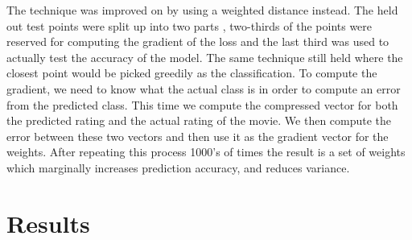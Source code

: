 \documentclass[review,onefignum,onetabnum]{siamart171218}
\begin{document}
The technique was improved on by using a weighted distance instead. The held out test points were split up into two parts , two-thirds of the points were reserved for computing the gradient of the loss and the last third was used to actually test the accuracy of the model. The same technique still held where the closest point would be picked greedily as the classification. To compute the gradient, we need to know what the actual class is in order to compute an error from the predicted class. This time we compute the compressed vector for both the predicted rating and the actual rating of the movie. We then compute the error between these two vectors and then use it as the gradient vector for the weights. After repeating this process 1000's of times the result is a set of weights which marginally increases prediction accuracy, and reduces variance.

\section{Results}
\label{sec:results}
\end{document}
